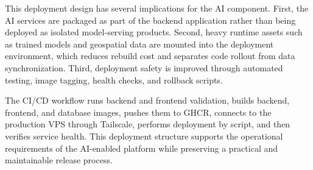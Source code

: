 This deployment design has several implications for the AI component. First, the AI services are packaged as part of the backend application rather than being deployed as isolated model-serving products. Second, heavy runtime assets such as trained models and geospatial data are mounted into the deployment environment, which reduces rebuild cost and separates code rollout from data synchronization. Third, deployment safety is improved through automated testing, image tagging, health checks, and rollback scripts.

The CI/CD workflow runs backend and frontend validation, builds backend, frontend, and database images, pushes them to GHCR, connects to the production VPS through Tailscale, performs deployment by script, and then verifies service health. This deployment structure supports the operational requirements of the AI-enabled platform while preserving a practical and maintainable release process.
